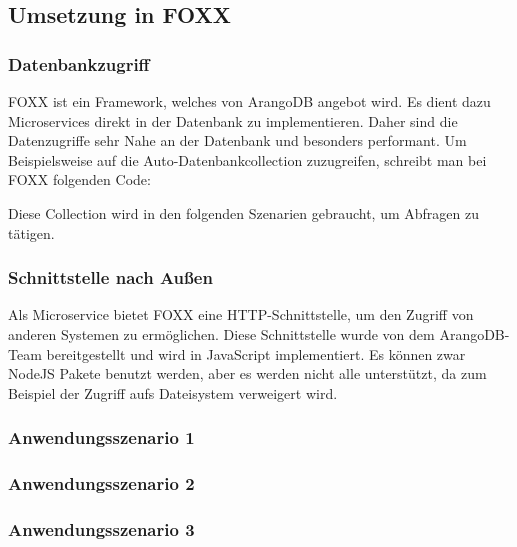 \subsection{Umsetzung in FOXX}
\subsubsection{Datenbankzugriff}
FOXX ist ein Framework, welches von ArangoDB angebot wird. Es dient dazu Microservices direkt in der Datenbank zu implementieren. Daher sind die Datenzugriffe sehr Nahe an der Datenbank und besonders performant. Um Beispielsweise auf die Auto-Datenbankcollection zuzugreifen, schreibt man bei FOXX folgenden Code:

Diese Collection wird in den folgenden Szenarien gebraucht, um Abfragen zu tätigen.
\subsubsection{Schnittstelle nach Außen}
Als Microservice bietet FOXX eine HTTP-Schnittstelle, um den Zugriff von anderen Systemen zu ermöglichen. Diese Schnittstelle wurde von dem ArangoDB-Team bereitgestellt und wird in JavaScript implementiert. Es können zwar NodeJS Pakete benutzt werden, aber es werden nicht alle unterstützt, da zum Beispiel der Zugriff aufs Dateisystem verweigert wird.
\subsubsection{Anwendungsszenario 1}

\subsubsection{Anwendungsszenario 2}

\subsubsection{Anwendungsszenario 3}
